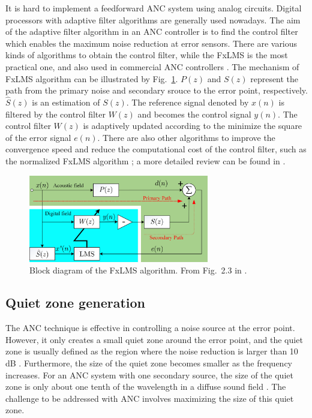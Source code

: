 {
It is hard to implement a feedforward ANC system using analog circuits. 
Digital processors with adaptive filter algorithms are generally used nowadays.
The aim of the adaptive filter algorithm in an ANC controller is to find the control filter which enables the maximum noise reduction at error sensors. 
There are various kinds of algorithms to obtain the control filter, while the FxLMS is the most practical one,
and also used in commercial ANC controllers \cite{Shi2020AlgorithmsImplementationsOvercome, Antysound2017TigerANCWiFiQUserManual}.
The mechanism of FxLMS algorithm can be illustrated by Fig.~\ref{fig:98sdjf83j}.
$P(z)$ and $S(z)$ represent the path from the primary noise and secondary srouce to the error point, respectively.
$\hat{S}(z)$ is an estimation of $S(z)$. 
The reference signal denoted by $x(n)$ is filtered by the control filter $W(z)$ and becomes the control signal $y(n)$.
The control filter $W(z)$ is adaptively updated according to the minimize the square of the error signal $e(n)$.
There are also other algorithms to improve the convergence speed and reduce the computational cost of the control filter, such as the normalized FxLMS algorithm \cite{Slock1993ConvergenceBehaviorLMS, Shi2015IdentificationParametricArray}; a more detailed review can be found in \cite{Shi2020AlgorithmsImplementationsOvercome}.
}
\begin{figure}[!htb]
    \centering
    \includegraphics[width = 0.7\textwidth]{fig/shi2019_fxlms.png}
    \caption{Block diagram of the FxLMS algorithm. From Fig.~2.3 in \cite{Shi2020AlgorithmsImplementationsOvercome}.}
    \label{fig:98sdjf83j}
\end{figure}



\subsection{Quiet zone generation}
\label{sec:review_anc_qz}
{The} ANC technique is effective {in controlling a noise source} at the error point. 
However, it only creates a small quiet zone around the error point, and the quiet zone is usually defined as the region where the noise reduction is larger than 10 dB \cite{Elliott2015ModelingLocalActive}. 
Furthermore, the size of the quiet zone becomes smaller as the frequency increases.
For an ANC system with one secondary source, the size of the quiet zone is only about one tenth of the wavelength in a diffuse sound field \cite{Guo1998EffectsReflectiveGround, Elliott1988ActiveCancellationPoint}. 
The challenge to be addressed with ANC involves maximizing the size of {this} quiet zone. 

